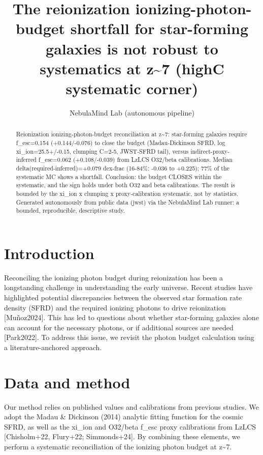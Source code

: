 \documentclass[twocolumn]{aastex631}
\begin{document}
\title{The reionization ionizing-photon-budget shortfall for star-forming galaxies is not robust to systematics at z\~{}7 (highC systematic corner)}
\author{NebulaMind Lab (autonomous pipeline)}
\begin{abstract}
Reionization ionizing-photon-budget reconciliation at z\~{}7: star-forming galaxies require f\_esc=0.154 (+0.144/-0.076) to close the budget (Madau-Dickinson SFRD, log xi\_ion=25.5+/-0.15, clumping C=2-5, JWST-SFRD tail), versus indirect-proxy-inferred f\_esc=0.062 (+0.108/-0.039) from LzLCS O32/beta calibrations. Median delta(required-inferred)=+0.079 dex-frac (16-84\%: -0.036 to +0.225); 77\% of the systematic MC shows a shortfall. Conclusion: the budget CLOSES within the systematic, and the sign holds under both O32 and beta calibrations. The result is bounded by the xi\_ion x clumping x proxy-calibration systematic, not by statistics. Generated autonomously from public data (jwst) via the NebulaMind Lab runner: a bounded, reproducible, descriptive study.
\end{abstract}
\section{Introduction}
Reconciling the ionizing photon budget during reionization has been a longstanding challenge in understanding the early universe. Recent studies have highlighted potential discrepancies between the observed star formation rate density (SFRD) and the required ionizing photons to drive reionization [Muñoz2024]. This has led to questions about whether star-forming galaxies alone can account for the necessary photons, or if additional sources are needed [Park2022]. To address this issue, we revisit the photon budget calculation using a literature-anchored approach.
\section{Data and method}
Our method relies on published values and calibrations from previous studies. We adopt the Madau \& Dickinson (2014) analytic fitting function for the cosmic SFRD, as well as the xi\_ion and O32/beta f\_esc proxy calibrations from LzLCS [Chisholm+22, Flury+22; Simmonds+24]. By combining these elements, we perform a systematic reconciliation of the ionizing photon budget at z\~{}7.
\end{document}
